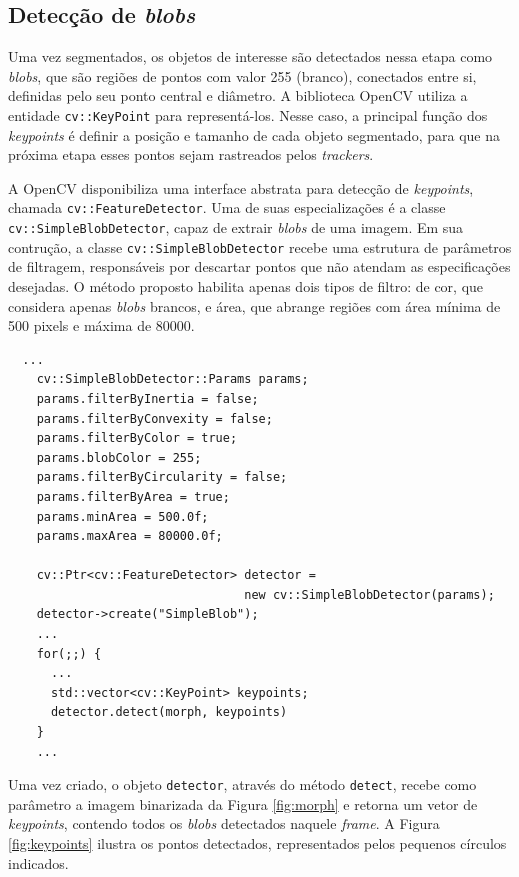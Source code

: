 
\subsection{Detecção de \textit{blobs}} %
\label{sub:detec_o_de_blobs}

Uma vez segmentados, os objetos de interesse são detectados nessa etapa como \textit{blobs}, que são regiões de pontos com valor 255 (branco), conectados entre si, definidas pelo seu ponto central e diâmetro. A biblioteca OpenCV utiliza a entidade \verb!cv::KeyPoint! para representá-los. Nesse caso, a principal função dos \textit{keypoints} é definir a posição e tamanho de cada objeto segmentado, para que na próxima etapa esses pontos sejam rastreados pelos \textit{trackers}.

A OpenCV disponibiliza uma interface abstrata para detecção de \textit{keypoints}, chamada \verb!cv::FeatureDetector!. Uma de suas especializações é a classe \verb!cv::SimpleBlobDetector!, capaz de extrair \textit{blobs} de uma imagem. Em sua contrução, a classe \verb!cv::SimpleBlobDetector! recebe uma estrutura de parâmetros de filtragem, responsáveis por descartar pontos que não atendam as especificações desejadas. O método proposto habilita apenas dois tipos de filtro: de cor, que considera apenas \textit{blobs} brancos, e área, que abrange regiões com área mínima de 500 pixels e máxima de 80000.

\begin{lstlisting}
  ...
    cv::SimpleBlobDetector::Params params;
    params.filterByInertia = false;
    params.filterByConvexity = false;
    params.filterByColor = true;
    params.blobColor = 255;
    params.filterByCircularity = false;
    params.filterByArea = true;
    params.minArea = 500.0f;
    params.maxArea = 80000.0f;

    cv::Ptr<cv::FeatureDetector> detector = 
                                 new cv::SimpleBlobDetector(params);
    detector->create("SimpleBlob");
    ...
    for(;;) {
      ...
      std::vector<cv::KeyPoint> keypoints;
      detector.detect(morph, keypoints)
    }
    ...  
\end{lstlisting}

Uma vez criado, o objeto \verb!detector!, através do método \verb!detect!, recebe como parâmetro a imagem binarizada da Figura \ref{fig:morph} e retorna um vetor de \textit{keypoints}, contendo todos os \textit{blobs} detectados naquele \textit{frame}. A Figura \ref{fig:keypoints} ilustra os pontos detectados, representados pelos pequenos círculos indicados. 

